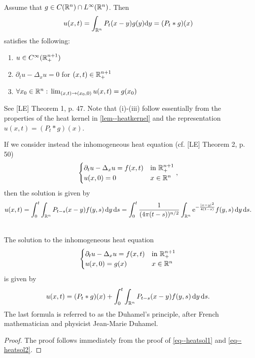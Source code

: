 \documentclass[11pt]{article}
\begin{document}
			\begin{thm}
				\phantom{k}\\ Assume that $g\in C(\mathbb{R}^n)\cap L^\infty(\mathbb{R}^n)$. Then 
				\begin{equation}\label{eq--heatsol1}
					u(x,t)=\int_{\mathbb{R}^n}P_t(x-y)g(y)\mathrm{d}y=(P_t\ast g)(x)
				\end{equation}
				satisfies the following:
				\begin{enumerate}
					\item $u\in C^\infty(\mathbb{R}^{n+1}_+)$
					\item $\partial_tu-\Delta_xu=0$ for $(x,t)\in\mathbb{R}^{n+1}_+$
					\item $
					\forall x_0\in\mathbb{R}^n:\,\lim_{(x,t)\to(x_0,0)}u(x,t)=g(x_0)$
				\end{enumerate}
			\end{thm}
			\begin{pproof}
				See [LE] Theorem 1, p. 47. Note that (i)-(iii) follow essentially from the properties of the heat kernel in \autoref{lem--heatkernel} and the representation $u(x,t)=(P_t\ast g)(x)$.
			\end{pproof}

			If we consider instead the inhomogeneous heat equation (cf. [LE] Theorem 2, p. 50)
			\begin{equation*}
				\begin{cases}
					\partial_tu-\Delta_xu=f(x,t) & \text{in }\mathbb{R}^{n+1}_+\\
					u(x,0)=0 & x\in\mathbb{R}^n
				\end{cases},
			\end{equation*}
			then the solution is given by 
			\begin{equation}\label{eq--heatsol2}
				u(x,t)=\int_0^t\int_{\mathbb{R}^n}P_{t-s}(x-y)f(y,s)\,\mathrm{d}y\,\mathrm{d}s=\int_0^t\frac{1}{(4\pi(t-s))^{n/2}}\int_{\mathbb{R}^n}\mathrm{e}^{-\frac{|x-y|^2}{4(t-s)}}f(y,s)\,\mathrm{d}y\,\mathrm{d}s.
			\end{equation}

			\begin{thm}
				\phantom{k}\\ The solution to the inhomogeneous heat equation
				\begin{equation*}
					\begin{cases}
						\partial_tu-\Delta_xu=f(x,t) & \text{in }\mathbb{R}^{n+1}_+\\
						u(x,0)=g(x) & x\in\mathbb{R}^n
					\end{cases}
				\end{equation*}
				is given by 
				\begin{equation*}
					u(x,t)=(P_t\ast g)(x)+\int_0^t\int_{\mathbb{R}^n}P_{t-s}(x-y)f(y,s)\,\mathrm{d}y\,\mathrm{d}s.
				\end{equation*}
				The last formula is referred to as the Duhamel's principle, after French mathematician and physicist Jean-Marie Duhamel.
			\end{thm}
			\begin{proof}
				The proof follows immediately from the proof of \eqref{eq--heatsol1} and \eqref{eq--heatsol2}.
					\end{proof}
\end{document}
